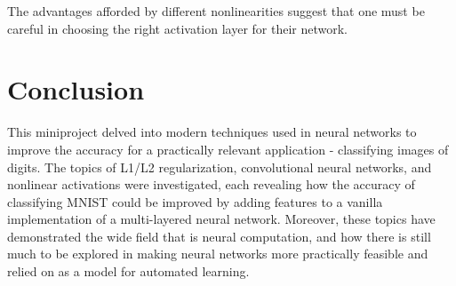 \documentclass{article}
\begin{document}
The advantages afforded by different nonlinearities suggest that one must be careful in choosing the right activation layer for their network.


\section{Conclusion}
This miniproject delved into modern techniques used in neural networks to improve the accuracy for a practically relevant application - classifying images of digits. The topics of L1/L2 regularization, convolutional neural networks, and nonlinear activations were investigated, each revealing how the accuracy of classifying MNIST could be improved by adding features to a vanilla implementation of a multi-layered neural network. Moreover, these topics have demonstrated the wide field that is neural computation, and how there is still much to be explored in making neural networks more practically feasible and relied on as a model for automated learning.
\end{document}
